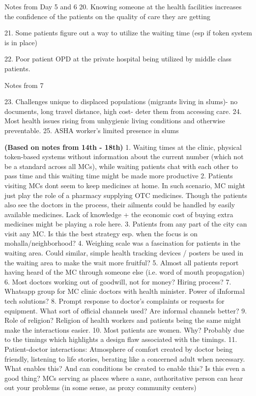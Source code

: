 Notes from Day 5 and 6
20. Knowing someone at the health facilities increases the confidence of the patients on the quality of care they are getting

21. Some patients figure out a way to utilize the waiting time (esp if token system is in place)

22. Poor patient OPD at the private hospital being utilized by middle class patients. 

Notes from 7

23. Challenges unique to displaced populations (migrants living in slums)- no documents, long travel distance, high cost- deter them from accessing care. 
24. Most health issues rising from unhygienic living conditions and otherwise preventable.
25. ASHA worker's limited presence in slums

\textbf{(Based on notes from 14th - 18th)}
1. Waiting times at the clinic, physical token-based systems without information about the current number (which not be a standard across all MCs), while waiting patients chat with each other to pass time and this waiting time might be made more productive
2. Patients visiting MCs dont seem to keep medicines at home. In such scenario, MC might just play the role of a pharmacy supplying OTC medicines. Though the patients also see the doctors in the process, their ailments could be handled by easily available medicines. Lack of knowledge + the economic cost of buying extra medicines might be playing a role here.
3. Patients from any part of the city can visit any MC. Is this the best strategy esp. when the focus is on mohalla/neighborhood?
4. Weighing scale was a fascination for patients in the waiting area. Could similar, simple health tracking devices / posters be used in the waiting area to make the wait more fruitful?
5. Almost all patients report having heard of the MC through someone else (i.e. word of mouth propagation)
6. Most doctors working out of goodwill, not for money? Hiring process?
7. Whatsapp group for MC clinic doctors with health minister. Power of iInformal tech solutions?
8. Prompt response to doctor's complaints or requests for equipment. What sort of official channels used? Are informal channels better?
9. Role of religion? Religion of health workers and patients being the same might make the interactions easier.
10. Most patients are women. Why? Probably due to the timings which highlights a design flaw associated with the timings.
11. Patient-doctor interactions: Atmosphere of comfort created by doctor being friendly, listening to life stories, berating like a concerned adult when necessary. What enables this? And can conditions be created to enable this? Is this even a good thing? MCs serving as places where a sane, authoritative person can hear out your problems (in some sense, as proxy community centers)
